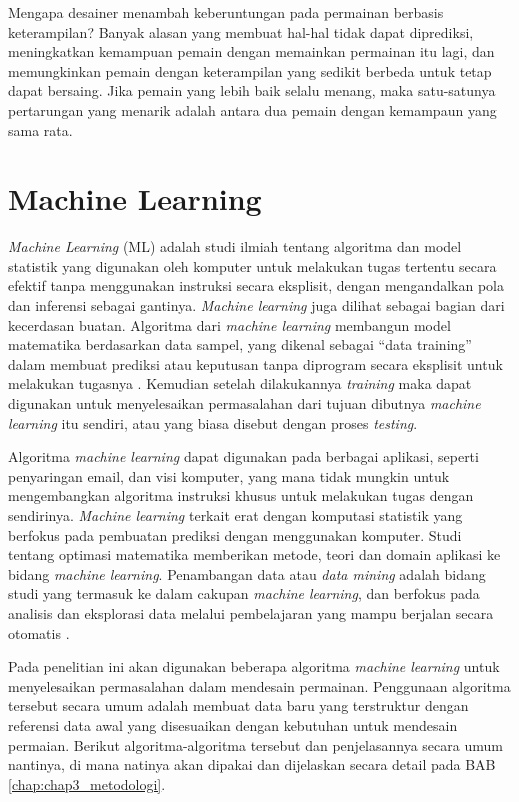 Mengapa desainer menambah keberuntungan pada permainan berbasis keterampilan? Banyak alasan yang membuat hal-hal tidak dapat diprediksi, meningkatkan kemampuan pemain dengan memainkan permainan itu lagi, dan memungkinkan pemain dengan keterampilan yang sedikit berbeda untuk tetap dapat bersaing. Jika pemain yang lebih baik selalu menang, maka satu-satunya pertarungan yang menarik adalah antara dua pemain dengan kemampaun yang sama rata.
\vspace{1ex}

\section{Machine Learning}
\label{sec:sec2_ML}
\vspace{1ex}

\textit{Machine Learning} (ML) adalah studi ilmiah tentang algoritma dan model statistik yang digunakan oleh komputer untuk melakukan tugas tertentu secara efektif tanpa menggunakan instruksi secara eksplisit, dengan mengandalkan pola dan inferensi sebagai gantinya. \textit{Machine learning} juga dilihat sebagai bagian dari kecerdasan buatan. Algoritma dari \textit{machine learning} membangun model matematika berdasarkan data sampel, yang dikenal sebagai ``data training'' dalam membuat prediksi atau keputusan tanpa diprogram secara eksplisit untuk melakukan tugasnya \citep{Koza1996}. Kemudian setelah dilakukannya \textit{training} maka dapat digunakan untuk menyelesaikan permasalahan dari tujuan dibutnya \textit{machine learning} itu sendiri, atau yang biasa disebut dengan proses \textit{testing}.
\vspace{1ex}

Algoritma \textit{machine learning} dapat digunakan pada berbagai aplikasi, seperti penyaringan email, dan visi komputer, yang mana tidak mungkin untuk mengembangkan algoritma instruksi khusus untuk melakukan tugas dengan sendirinya. \textit{Machine learning} terkait erat dengan komputasi statistik yang berfokus pada pembuatan prediksi dengan menggunakan komputer. Studi tentang optimasi matematika memberikan metode, teori dan domain aplikasi ke bidang \textit{machine learning}. Penambangan data atau \textit{data mining} adalah bidang studi yang termasuk ke dalam cakupan \textit{machine learning}, dan berfokus pada analisis dan eksplorasi data melalui pembelajaran yang mampu berjalan secara otomatis \citep{Friedman1997}.
\vspace{1ex}

Pada penelitian ini akan digunakan beberapa algoritma \textit{machine learning} untuk menyelesaikan permasalahan dalam mendesain permainan. Penggunaan algoritma tersebut secara umum adalah membuat data baru yang terstruktur dengan referensi data awal yang disesuaikan dengan kebutuhan untuk mendesain permaian. Berikut algoritma-algoritma tersebut dan penjelasannya secara umum nantinya, di mana natinya akan dipakai dan dijelaskan secara detail pada BAB \ref{chap:chap3_metodologi}.
\vspace{1ex}


